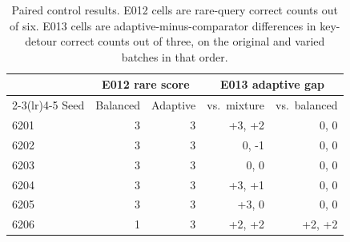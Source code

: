 \begin{table}[H]
\centering
\caption{Paired control results. E012 cells are rare-query correct
counts out of six. E013 cells are adaptive-minus-comparator differences
in key-detour correct counts out of three, on the original and varied
batches in that order.}
\label{tab:controls-seeds}
\begin{tabular}{lrrrr}
\toprule
& \multicolumn{2}{c}{E012 rare score} & \multicolumn{2}{c}{E013 adaptive gap} \\
\cmidrule(lr){2-3}\cmidrule(lr){4-5}
Seed & Balanced & Adaptive & vs.\ mixture & vs.\ balanced \\
\midrule
6201 & 3 & 3 & +3, +2 & 0, 0 \\
6202 & 3 & 3 & 0, -1 & 0, 0 \\
6203 & 3 & 3 & 0, 0 & 0, 0 \\
6204 & 3 & 3 & +3, +1 & 0, 0 \\
6205 & 3 & 3 & +3, 0 & 0, 0 \\
6206 & 1 & 3 & +2, +2 & +2, +2 \\
\bottomrule
\end{tabular}
\end{table}
